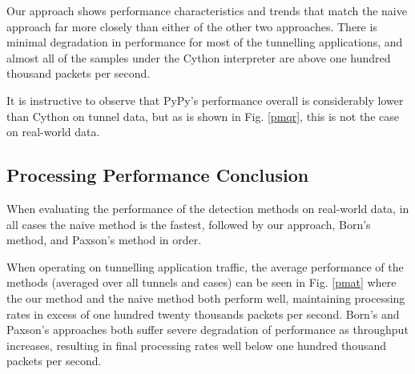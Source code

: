 \documentclass{llncs}
\begin{document}



Our approach shows performance characteristics and trends that match
the naive approach far more closely than either of the other two approaches.
There is minimal degradation in performance for most of the tunnelling
applications, and almost all of the samples under the Cython interpreter are
above one hundred thousand packets per second.

It is instructive to observe that PyPy's performance overall is considerably
lower than Cython on tunnel data, but as is shown in Fig. \ref{pmqr}, this is
not the case on real-world data.

\subsection{Processing Performance Conclusion}

When evaluating the performance of the detection methods on real-world data, in all
cases the naive method is the fastest, followed by our approach, Born's
method, and Paxson's method in order.

When operating on tunnelling application traffic, the average performance of the
methods (averaged over all tunnels and cases) can be seen in Fig. \ref{pmat}
where the our method and the naive method both perform well, maintaining processing
rates in excess of one hundred twenty thousands packets per second. Born's and
Paxson's approaches both suffer severe degradation of performance as throughput
increases, resulting in final processing rates well below one hundred thousand
packets per second.
\end{document}
